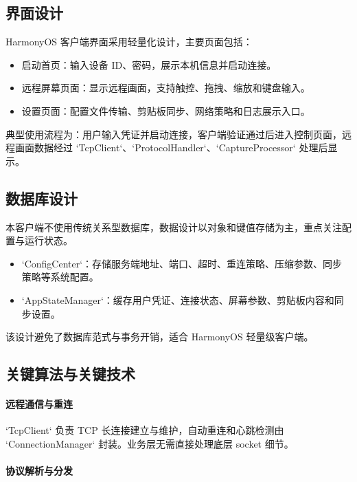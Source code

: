 \documentclass[12pt,a4paper]{article}
\begin{document}
\subsection{界面设计}

HarmonyOS 客户端界面采用轻量化设计，主要页面包括：
\begin{itemize}
    \item 启动首页：输入设备 ID、密码，展示本机信息并启动连接。
    \item 远程屏幕页面：显示远程画面，支持触控、拖拽、缩放和键盘输入。
    \item 设置页面：配置文件传输、剪贴板同步、网络策略和日志展示入口。
\end{itemize}

典型使用流程为：用户输入凭证并启动连接，客户端验证通过后进入控制页面，远程画面数据经过 `TcpClient`、`ProtocolHandler`、`CaptureProcessor` 处理后显示。

\subsection{数据库设计}

本客户端不使用传统关系型数据库，数据设计以对象和键值存储为主，重点关注配置与运行状态。

\begin{itemize}
    \item `ConfigCenter`：存储服务端地址、端口、超时、重连策略、压缩参数、同步策略等系统配置。
    \item `AppStateManager`：缓存用户凭证、连接状态、屏幕参数、剪贴板内容和同步设置。
\end{itemize}

该设计避免了数据库范式与事务开销，适合 HarmonyOS 轻量级客户端。

\subsection{关键算法与关键技术}

\paragraph{远程通信与重连}

`TcpClient` 负责 TCP 长连接建立与维护，自动重连和心跳检测由 `ConnectionManager` 封装。业务层无需直接处理底层 socket 细节。

\paragraph{协议解析与分发}
\end{document}
